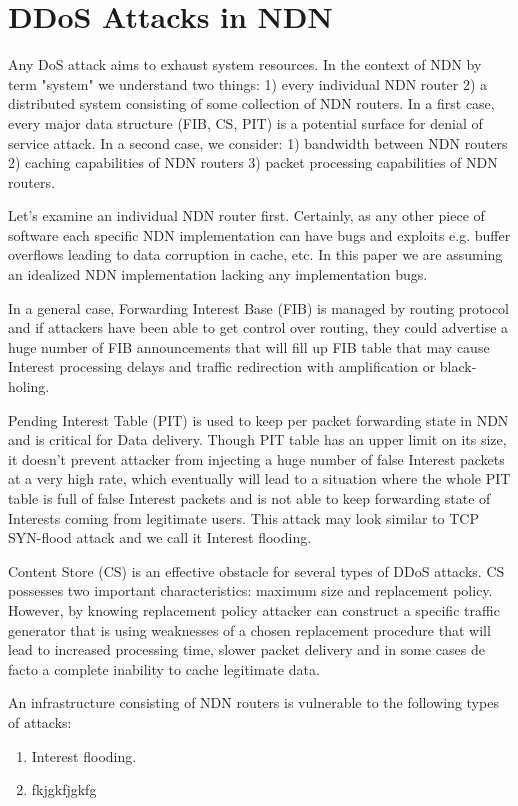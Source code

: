 \section { DDoS Attacks in NDN \label{ddos-ndn}}
Any DoS attack aims to exhaust system resources. In the context of NDN by term "system" we understand two things: 1) every individual NDN router 2) a distributed system consisting of some collection of NDN routers. In a first case, every major data structure (FIB, CS, PIT) is a potential surface for denial of service attack. In a second case, we consider: 1) bandwidth between NDN routers 2) caching capabilities of NDN routers 3) packet processing capabilities of NDN routers.

Let's examine an individual NDN router first. Certainly, as any other piece of software each specific NDN implementation can have bugs and exploits e.g. buffer overflows leading to data corruption in cache, etc. In this paper we are assuming an idealized NDN implementation lacking any implementation bugs. 

In a general case, Forwarding Interest Base (FIB) is managed by routing protocol and if attackers have been able to get control over routing, they could advertise a huge number of FIB announcements that will fill up FIB table that may cause Interest processing delays and traffic redirection with amplification or black-holing.

Pending Interest Table (PIT) is used to keep per packet forwarding state in NDN and is critical for Data delivery. Though PIT table has an upper limit on its size, it doesn't prevent attacker from injecting a huge number of false Interest packets at a very high rate, which eventually will lead to a situation where the whole PIT table is full of false Interest packets and is not able to keep forwarding state of Interests coming from legitimate users. This attack may look similar to TCP SYN-flood attack and we call it Interest flooding. 

Content Store (CS) is an effective obstacle for several types of DDoS attacks. CS possesses two important characteristics: maximum size and replacement policy. However, by knowing replacement policy attacker can construct a specific traffic generator that is using weaknesses of a chosen replacement procedure that will lead to increased processing time, slower packet delivery and in some cases de facto a complete inability to cache legitimate data. 

An infrastructure consisting of NDN routers is vulnerable to the following types of attacks: 
\begin{enumerate}
\item Interest flooding. 
\item fkjgkfjgkfg
\end{enumerate} 


